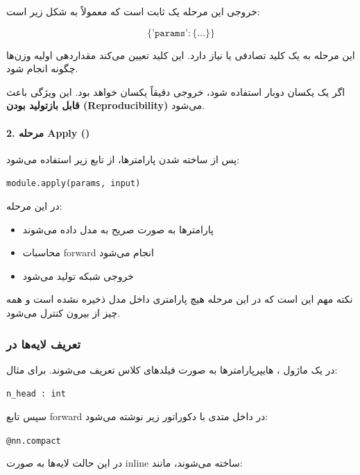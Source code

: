 \documentclass{article}
\begin{document}
خروجی این مرحله یک  ثابت است که معمولاً به شکل زیر است:

\[
\{\texttt{'params'} : \{\ldots\}\}
\]

این مرحله به یک کلید تصادفی یا  نیاز دارد. این کلید تعیین می‌کند مقداردهی اولیه وزن‌ها چگونه انجام شود.

اگر یک  یکسان دوبار استفاده شود، خروجی دقیقاً یکسان خواهد بود. این ویژگی باعث \textbf{قابل بازتولید بودن (Reproducibility)} می‌شود.



\paragraph{2. مرحله Apply ()}

پس از ساخته شدن پارامترها، از تابع زیر استفاده می‌شود:

\begin{latin}
	\texttt{module.apply(params, input)}
\end{latin}

در این مرحله:

\begin{itemize}
	\item پارامترها به صورت صریح به مدل داده می‌شوند
	\item محاسبات forward انجام می‌شود
	\item خروجی شبکه تولید می‌شود
\end{itemize}

نکته مهم این است که در این مرحله هیچ پارامتری داخل مدل ذخیره نشده است و همه چیز از بیرون کنترل می‌شود.

\subsubsection*{تعریف لایه‌ها در }

در یک ماژول ، هایپرپارامترها به صورت فیلدهای کلاس تعریف می‌شوند. برای مثال:

\begin{latin}
	\texttt{n\_head : int}
\end{latin}

سپس تابع forward در داخل متدی با دکوراتور زیر نوشته می‌شود:

\begin{latin}
	\texttt{@nn.compact}
\end{latin}

در این حالت لایه‌ها به صورت inline ساخته می‌شوند، مانند:
\end{document}
